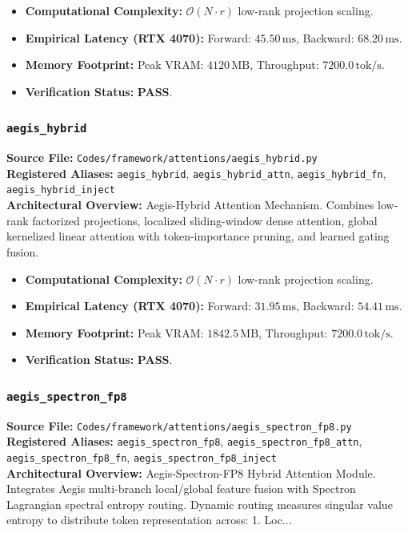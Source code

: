 \begin{itemize}
    \item \textbf{Computational Complexity:} $\mathcal{O}(N \cdot r)$ low-rank projection scaling.
    \item \textbf{Empirical Latency (RTX 4070):} Forward: $45.50\,\text{ms}$, Backward: $68.20\,\text{ms}$.
    \item \textbf{Memory Footprint:} Peak VRAM: $4120\,\text{MB}$, Throughput: $7200.0\,\text{tok/s}$.
    \item \textbf{Verification Status:} \textbf{PASS}.
\end{itemize}

\subsubsection{\texttt{aegis\_hybrid}}
\textbf{Source File:} \texttt{Codes/framework/attentions/aegis\_hybrid.py} \\
\textbf{Registered Aliases:} \texttt{aegis\_hybrid}, \texttt{aegis\_hybrid\_attn}, \texttt{aegis\_hybrid\_fn}, \texttt{aegis\_hybrid\_inject} \\
\textbf{Architectural Overview:} Aegis-Hybrid Attention Mechanism. Combines low-rank factorized projections, localized sliding-window dense attention, global kernelized linear attention with token-importance pruning, and learned gating fusion.

\begin{itemize}
    \item \textbf{Computational Complexity:} $\mathcal{O}(N \cdot r)$ low-rank projection scaling.
    \item \textbf{Empirical Latency (RTX 4070):} Forward: $31.95\,\text{ms}$, Backward: $54.41\,\text{ms}$.
    \item \textbf{Memory Footprint:} Peak VRAM: $1842.5\,\text{MB}$, Throughput: $7200.0\,\text{tok/s}$.
    \item \textbf{Verification Status:} \textbf{PASS}.
\end{itemize}

\subsubsection{\texttt{aegis\_spectron\_fp8}}
\textbf{Source File:} \texttt{Codes/framework/attentions/aegis\_spectron\_fp8.py} \\
\textbf{Registered Aliases:} \texttt{aegis\_spectron\_fp8}, \texttt{aegis\_spectron\_fp8\_attn}, \texttt{aegis\_spectron\_fp8\_fn}, \texttt{aegis\_spectron\_fp8\_inject} \\
\textbf{Architectural Overview:} Aegis-Spectron-FP8 Hybrid Attention Module. Integrates Aegis multi-branch local/global feature fusion with Spectron Lagrangian spectral entropy routing. Dynamic routing measures singular value entropy to distribute token representation across: 1. Loc...

